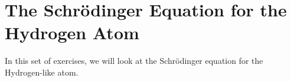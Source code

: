 %
%
%
%

\section*{The Schr\"odinger Equation for the Hydrogen Atom}

	In this set of exercises, we will look at the Schr\"odinger equation for the Hydrogen-like atom.

